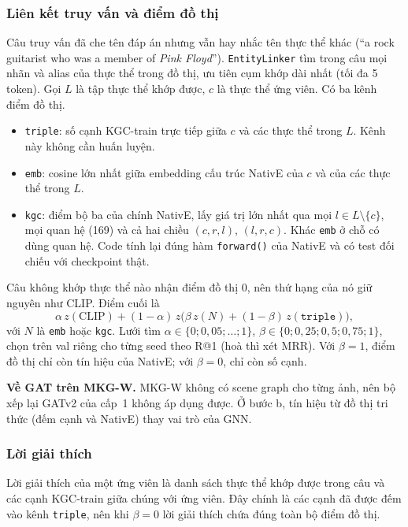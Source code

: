 \subsubsection{Liên kết truy vấn và điểm đồ thị}
Câu truy vấn đã che tên đáp án nhưng vẫn hay nhắc tên thực thể khác (``a rock guitarist who was a member of \emph{Pink
Floyd}''). \texttt{EntityLinker} tìm trong câu mọi nhãn và alias của thực thể trong đồ thị, ưu tiên cụm khớp dài nhất (tối
đa 5 token). Gọi $L$ là tập thực thể khớp được, $c$ là thực thể ứng viên. Có ba kênh điểm đồ thị.
\begin{itemize}
\item \texttt{triple}: số cạnh KGC-train trực tiếp giữa $c$ và các thực thể trong $L$. Kênh này không cần huấn luyện.
\item \texttt{emb}: cosine lớn nhất giữa embedding cấu trúc NativE của $c$ và của các thực thể trong $L$.
\item \texttt{kgc}: điểm bộ ba của chính NativE, lấy giá trị lớn nhất qua mọi $l \in L\setminus\{c\}$, mọi quan hệ (169)
và cả hai chiều $(c, r, l)$, $(l, r, c)$. Khác \texttt{emb} ở chỗ có dùng quan hệ. Code tính lại đúng hàm
\texttt{forward()} của NativE và có test đối chiếu với checkpoint thật.
\end{itemize}
Câu không khớp thực thể nào nhận điểm đồ thị 0, nên thứ hạng của nó giữ nguyên như CLIP. Điểm cuối là
\begin{equation}
\alpha\,z(\text{CLIP}) + (1-\alpha)\,z\big(\beta\,z(N) + (1-\beta)\,z(\texttt{triple})\big),
\end{equation}
với $N$ là \texttt{emb} hoặc \texttt{kgc}. Lưới tìm $\alpha \in \{0; 0{,}05; \dots; 1\}$,
$\beta \in \{0; 0{,}25; 0{,}5; 0{,}75; 1\}$, chọn trên val riêng cho từng seed theo R@1 (hoà thì xét MRR). Với
$\beta = 1$, điểm đồ thị chỉ còn tín hiệu của NativE; với $\beta = 0$, chỉ còn số cạnh.

\textbf{Về GAT trên MKG-W.} MKG-W không có scene graph cho từng ảnh, nên bộ xếp lại GATv2 của cấp~1 không áp dụng được. Ở
bước b, tín hiệu từ đồ thị tri thức (đếm cạnh và NativE) thay vai trò của GNN.

\subsubsection{Lời giải thích}\label{sec:l2-expl}
Lời giải thích của một ứng viên là danh sách thực thể khớp được trong câu và các cạnh KGC-train giữa chúng với ứng viên. Đây
chính là các cạnh đã được đếm vào kênh \texttt{triple}, nên khi $\beta = 0$ lời giải thích chứa đúng toàn bộ điểm đồ thị.

